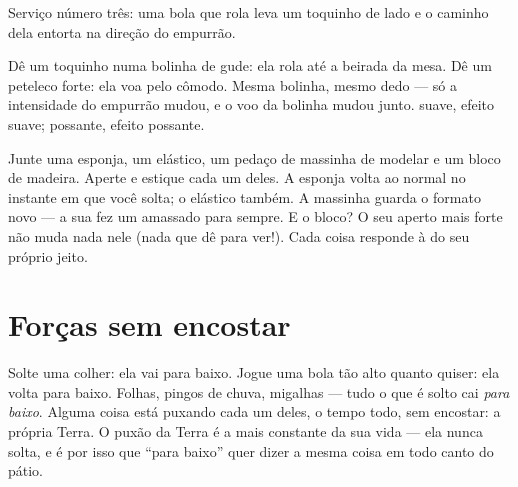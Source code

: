 \begin{omfigure}

{\small Serviço número três: uma bola que rola leva um toquinho de
lado e o caminho dela entorta na direção do empurrão.}
\end{omfigure}

\begin{example}\label{ex:g2:pushes-and-pulls:stronger}
Dê um toquinho numa bolinha de gude: ela rola até a beirada da mesa.
Dê um peteleco forte: ela voa pelo cômodo. Mesma bolinha, mesmo dedo
--- só a intensidade do empurrão mudou, e o voo da bolinha mudou
junto.  suave, efeito suave;  possante, efeito possante.
\end{example}

\begin{example}\label{ex:g2:pushes-and-pulls:shape}
Junte uma esponja, um elástico, um pedaço de massinha de modelar e um
bloco de madeira. Aperte e estique cada um deles. A esponja volta ao
normal no instante em que você solta; o elástico também. A massinha
guarda o formato novo --- a sua  fez um amassado para sempre. E
o bloco? O seu aperto mais forte não muda nada nele (nada que dê para
ver!). Cada coisa responde à  do seu próprio jeito.
\end{example}

\section{Forças sem encostar}

\begin{example}\label{ex:g2:pushes-and-pulls:earthpull}
Solte uma colher: ela vai para baixo. Jogue uma bola tão alto quanto
quiser: ela volta para baixo. Folhas, pingos de chuva, migalhas ---
tudo o que é solto cai \emph{para baixo}. Alguma coisa está puxando
cada um deles, o tempo todo, sem encostar: a própria Terra. O puxão
da Terra é a  mais constante da sua vida --- ela nunca solta, e
é por isso que ``para baixo'' quer dizer a mesma coisa em todo canto
do pátio.
\end{example}

